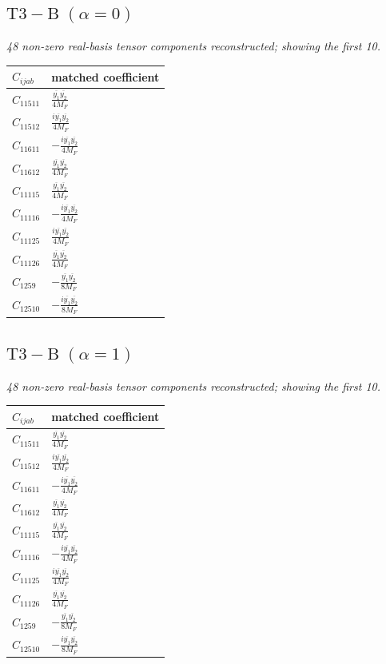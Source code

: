 \documentclass[9pt]{article}
\begin{document}
\subsection*{$ \mathrm{T3-B}\;(\alpha=0) $}
\textit{48 non-zero real-basis tensor components reconstructed; showing the first 10.}
\begin{longtable}{@{}ll@{}}
\toprule
$C_{ijab}$ & matched coefficient \\
\midrule
$C_{11511}$ & $ \frac{\overline{y_{1}} \overline{y_{2}}}{4 M_F} $ \\
$C_{11512}$ & $ \frac{i \overline{y_{1}} \overline{y_{2}}}{4 M_F} $ \\
$C_{11611}$ & $ - \frac{i \overline{y_{1}} \overline{y_{2}}}{4 M_F} $ \\
$C_{11612}$ & $ \frac{\overline{y_{1}} \overline{y_{2}}}{4 M_F} $ \\
$C_{11115}$ & $ \frac{\overline{y_{1}} \overline{y_{2}}}{4 M_F} $ \\
$C_{11116}$ & $ - \frac{i \overline{y_{1}} \overline{y_{2}}}{4 M_F} $ \\
$C_{11125}$ & $ \frac{i \overline{y_{1}} \overline{y_{2}}}{4 M_F} $ \\
$C_{11126}$ & $ \frac{\overline{y_{1}} \overline{y_{2}}}{4 M_F} $ \\
$C_{1259}$ & $ - \frac{\overline{y_{1}} \overline{y_{2}}}{8 M_F} $ \\
$C_{12510}$ & $ - \frac{i \overline{y_{1}} \overline{y_{2}}}{8 M_F} $ \\
\bottomrule
\end{longtable}
\subsection*{$ \mathrm{T3-B}\;(\alpha=1) $}
\textit{48 non-zero real-basis tensor components reconstructed; showing the first 10.}
\begin{longtable}{@{}ll@{}}
\toprule
$C_{ijab}$ & matched coefficient \\
\midrule
$C_{11511}$ & $ \frac{\overline{y_{1}} \overline{y_{2}}}{4 M_F} $ \\
$C_{11512}$ & $ \frac{i \overline{y_{1}} \overline{y_{2}}}{4 M_F} $ \\
$C_{11611}$ & $ - \frac{i \overline{y_{1}} \overline{y_{2}}}{4 M_F} $ \\
$C_{11612}$ & $ \frac{\overline{y_{1}} \overline{y_{2}}}{4 M_F} $ \\
$C_{11115}$ & $ \frac{\overline{y_{1}} \overline{y_{2}}}{4 M_F} $ \\
$C_{11116}$ & $ - \frac{i \overline{y_{1}} \overline{y_{2}}}{4 M_F} $ \\
$C_{11125}$ & $ \frac{i \overline{y_{1}} \overline{y_{2}}}{4 M_F} $ \\
$C_{11126}$ & $ \frac{\overline{y_{1}} \overline{y_{2}}}{4 M_F} $ \\
$C_{1259}$ & $ - \frac{\overline{y_{1}} \overline{y_{2}}}{8 M_F} $ \\
$C_{12510}$ & $ - \frac{i \overline{y_{1}} \overline{y_{2}}}{8 M_F} $ \\
\bottomrule
\end{longtable}
\end{document}
